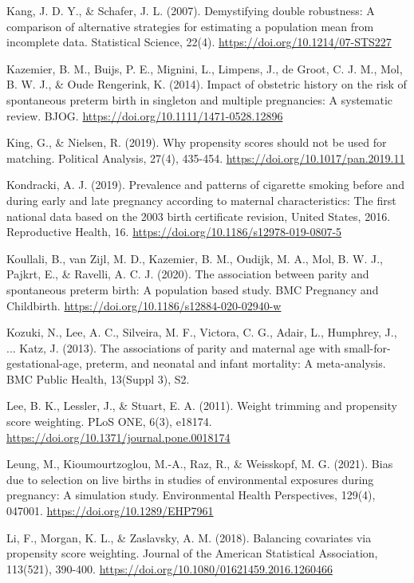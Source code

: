 \documentclass[11pt,letterpaper]{article}
\begin{document}
{Kang, J. D. Y., \& Schafer, J. L. (2007). Demystifying double robustness: A comparison of alternative strategies for estimating a population mean from incomplete data. Statistical Science, 22(4). \url{https://doi.org/10.1214/07-STS227}

Kazemier, B. M., Buijs, P. E., Mignini, L., Limpens, J., de Groot, C. J. M., Mol, B. W. J., \& Oude Rengerink, K. (2014). Impact of obstetric history on the risk of spontaneous preterm birth in singleton and multiple pregnancies: A systematic review. BJOG. \url{https://doi.org/10.1111/1471-0528.12896}

King, G., \& Nielsen, R. (2019). Why propensity scores should not be used for matching. Political Analysis, 27(4), 435-454. \url{https://doi.org/10.1017/pan.2019.11}

Kondracki, A. J. (2019). Prevalence and patterns of cigarette smoking before and during early and late pregnancy according to maternal characteristics: The first national data based on the 2003 birth certificate revision, United States, 2016. Reproductive Health, 16. \url{https://doi.org/10.1186/s12978-019-0807-5}

Koullali, B., van Zijl, M. D., Kazemier, B. M., Oudijk, M. A., Mol, B. W. J., Pajkrt, E., \& Ravelli, A. C. J. (2020). The association between parity and spontaneous preterm birth: A population based study. BMC Pregnancy and Childbirth. \url{https://doi.org/10.1186/s12884-020-02940-w}

Kozuki, N., Lee, A. C., Silveira, M. F., Victora, C. G., Adair, L., Humphrey, J., ... Katz, J. (2013). The associations of parity and maternal age with small-for-gestational-age, preterm, and neonatal and infant mortality: A meta-analysis. BMC Public Health, 13(Suppl 3), S2.

Lee, B. K., Lessler, J., \& Stuart, E. A. (2011). Weight trimming and propensity score weighting. PLoS ONE, 6(3), e18174. \url{https://doi.org/10.1371/journal.pone.0018174}

Leung, M., Kioumourtzoglou, M.-A., Raz, R., \& Weisskopf, M. G. (2021). Bias due to selection on live births in studies of environmental exposures during pregnancy: A simulation study. Environmental Health Perspectives, 129(4), 047001. \url{https://doi.org/10.1289/EHP7961}

Li, F., Morgan, K. L., \& Zaslavsky, A. M. (2018). Balancing covariates via propensity score weighting. Journal of the American Statistical Association, 113(521), 390-400. \url{https://doi.org/10.1080/01621459.2016.1260466}

}
\end{document}
